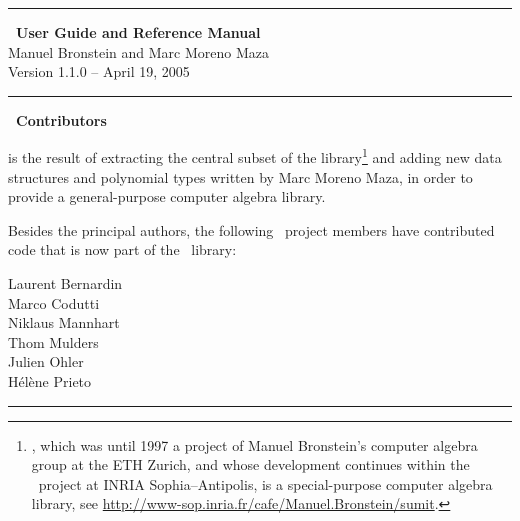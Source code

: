 \thispagestyle{empty}
\begin{center}
\vskip 5cm
\hrule
\vskip 0.5cm
{\LARGE\bf\stdmath~User Guide and Reference Manual}\\
\vskip 1cm
{\Large Manuel Bronstein and Marc Moreno Maza}\\
\vskip 1cm
{\Large Version 1.1.0 -- April 19, 2005}\\
\vskip 0.5cm
\hrule
\end{center}
\newpage
\begin{center}
{\Large\bf \stdmath~Contributors}\\
\end{center}
\vskip 2cm
{\large
\stdmath is the result of extracting the central subset of
the \sumit library\footnote{\sumit, which was until 1997
a project of Manuel Bronstein's computer algebra group at the
ETH Zurich, and whose development continues within the \cafe~project
at INRIA Sophia--Antipolis, is a special-purpose computer algebra
library, see \url{http://www-sop.inria.fr/cafe/Manuel.Bronstein/sumit}.}
and adding new data structures and polynomial types written by
Marc Moreno Maza, in order to provide a general-purpose
computer algebra library.

\noindent
Besides the principal authors, the following
\sumit~project members have contributed code
that is now part of the \stdmath~library:\\
\vskip 1cm
\begin{center}
Laurent Bernardin\\
Marco Codutti\\
Niklaus Mannhart\\
Thom Mulders\\
Julien Ohler\\
H\'el\`ene Prieto\\
\end{center}
\vskip 2cm
}
\vskip 0.5cm
\hrule
\newpage
